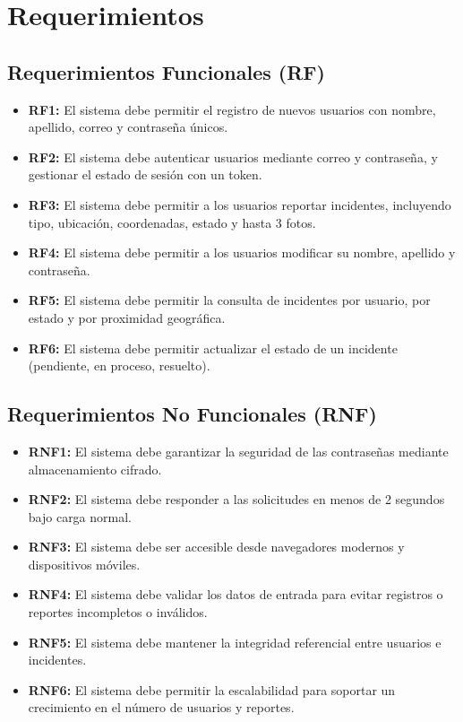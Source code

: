 \section{Requerimientos}

\subsection*{Requerimientos Funcionales (RF)}

\begin{itemize}
    \item \textbf{RF1:} El sistema debe permitir el registro de nuevos usuarios con nombre, apellido, correo y contraseña únicos.
    \item \textbf{RF2:} El sistema debe autenticar usuarios mediante correo y contraseña, y gestionar el estado de sesión con un token.
    \item \textbf{RF3:} El sistema debe permitir a los usuarios reportar incidentes, incluyendo tipo, ubicación, coordenadas, estado y hasta 3 fotos.
    \item \textbf{RF4:} El sistema debe permitir a los usuarios modificar su nombre, apellido y contraseña.
    \item \textbf{RF5:} El sistema debe permitir la consulta de incidentes por usuario, por estado y por proximidad geográfica.
    \item \textbf{RF6:} El sistema debe permitir actualizar el estado de un incidente (pendiente, en proceso, resuelto).
\end{itemize}

\subsection*{Requerimientos No Funcionales (RNF)}

\begin{itemize}
    \item \textbf{RNF1:} El sistema debe garantizar la seguridad de las contraseñas mediante almacenamiento cifrado.
    \item \textbf{RNF2:} El sistema debe responder a las solicitudes en menos de 2 segundos bajo carga normal.
    \item \textbf{RNF3:} El sistema debe ser accesible desde navegadores modernos y dispositivos móviles.
    \item \textbf{RNF4:} El sistema debe validar los datos de entrada para evitar registros o reportes incompletos o inválidos.
    \item \textbf{RNF5:} El sistema debe mantener la integridad referencial entre usuarios e incidentes.
    \item \textbf{RNF6:} El sistema debe permitir la escalabilidad para soportar un crecimiento en el número de usuarios y reportes.
\end{itemize}